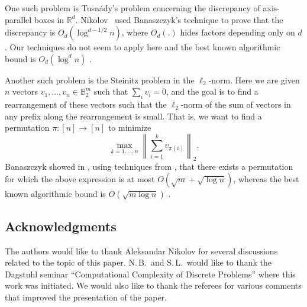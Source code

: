 \documentclass{toc}
\begin{document}
One such problem is Tusn\'{a}dy's problem
%
%
concerning  %
%
the discrepancy of axis-parallel boxes in $\mathbb{R}^d$. Nikolov~\cite{Sasho16} used Banaszczyk's technique to prove that the discrepancy is $O_d(\log^{d-1/2}n)$, where $O_d(.)$ hides factors depending only on $d$. Our techniques do not seem to apply here and the best known algorithmic bound is $O_d(\log^d n)$ \cite{BG17}.

Another such problem is the Steinitz problem in the $\ell_2$-norm. Here we are given $n$ vectors $v_1,\dots,v_n\in\mathbb{B}_2^m$ such that $\sum_i v_i=0$, and the goal is to find a rearrangement of these vectors such that the $\ell_2$-norm of the sum of vectors in any prefix along the rearrangement is small. That is, we want to find a permutation $\pi:[n]\rightarrow [n]$ to minimize
\[ \max_{k=1,\ldots,n} \left\| \sum_{i=1}^k  v_{\pi(i)}  \right\|_2. \]
Banaszczyk 
showed   %
in \cite{Bana12}, using techniques from \cite{B97},
%
that there exists a permutation for which the above expression is at most $O(\sqrt{m}+\sqrt{\log n})$, whereas the best known algorithmic bound is $O(\sqrt{m\log n})$ \cite{BG17}.

\subsection*{Acknowledgments}

The authors would like to thank Aleksandar Nikolov 
for several discussions related to the topic of this paper. N.\,B.\ and
S.\,L.\ would like to thank
the Dagstuhl seminar ``Computational Complexity of Discrete Problems'' where this work was initiated. We would also like to thank the referees for various comments that improved the presentation of the paper. 

\nocite{conf-version}


%
%
%
%

\end{document}
